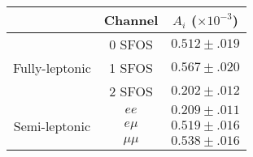 \begin{tabular}{|cc||c|}
\hline
& Channel & $A_i$ ($\times 10^{-3}$)\\
\hline\hline
\multirow{3}{*}{Fully-leptonic} & 0 SFOS & $0.512 \pm .019$ \\
				& 1 SFOS & $0.567 \pm .020$ \\
                                & 2 SFOS & $0.202 \pm .012$ \\
\hline
\multirow{3}{*}{Semi-leptonic} & $ee$     & $0.209 \pm .011$\\
                               & $e\mu$   & $0.519 \pm .016$\\
                               & $\mu\mu$ & $0.538 \pm .016$\\
\hline
\end{tabular}
